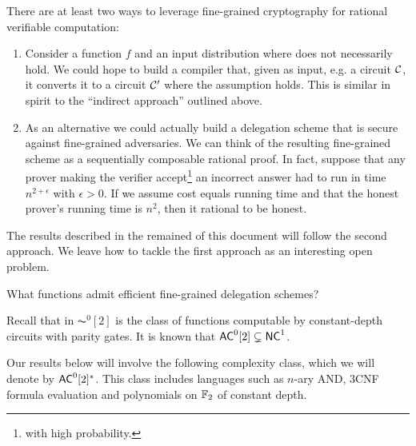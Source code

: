 {%
There are  at least two ways to leverage fine-grained cryptography for rational verifiable computation:
\begin{enumerate}
	\item Consider a function $f$ and an input distribution where \NoFLAVA does not necessarily hold. We could hope to build a compiler that, given as input, e.g. a circuit $\cal{C}$, it converts it to a circuit $\cal{C}'$ where the assumption holds.
	This is similar in spirit to the ``indirect approach'' outlined above. %
	\item As an alternative we could actually build a delegation scheme that is secure against fine-grained adversaries. We can think of the resulting fine-grained scheme as a sequentially composable rational proof. In fact, suppose that any prover making the verifier accept\footnote{with high probability.} an incorrect answer had to run in time $n^{2+\epsilon}$ with $\epsilon > 0$. If we assume cost equals running time and that the honest prover's running time is $n^2$, then it rational to be honest. 
\end{enumerate}

The results described in the remained of this document will follow the second approach.
We leave how to tackle the first approach as an interesting open problem.

\begin{question}
	What functions admit efficient fine-grained delegation schemes?
\end{question}



Recall that in $\AC^0[2]$ is the class of functions computable by constant-depth circuits with
parity gates. It is known that ${\mathsf{AC}}^0[2] \subsetneq {\ensuremath{\mathsf{NC}}}^1$.

Our results below will involve the following complexity class, which we will denote by ${\mathsf{AC}}^0[2]^*$. This class includes languages such as $n$-ary AND, 3CNF formula evaluation and polynomials on $\mathbb{F}_2$ of constant depth. 

}
